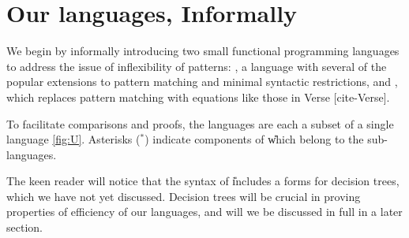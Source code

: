 \documentclass[manuscript,screen,review, 12pt]{acmart}
\begin{document}
\section{Our languages, Informally}

We begin by informally introducing two small functional programming languages to
address the issue of inflexibility of patterns: \PPlus, a language with several
of the popular extensions to pattern matching and minimal syntactic
restrictions, and \VMinus, which replaces pattern matching with equations like
those in Verse [cite-Verse]. 

To facilitate comparisons and proofs, the languages are each a subset of a 
single language \U \ref{fig:U}. Asterisks (${}^{*}$) indicate components of \U which 
belong to the sub-languages. 

The keen reader will notice that the syntax of \U includes a forms for
decision trees, which we have not yet discussed. Decision trees will be crucial
in proving properties of efficiency of our languages, and will we be discussed
in full in a later section. 
\end{document}
